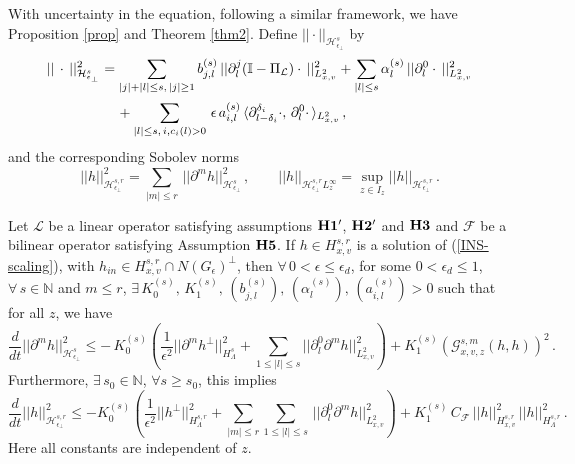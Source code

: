 \documentclass[final,onefignum,onetabnum]{siamart171218}
\begin{document}
With uncertainty in the equation, following a similar framework, we have Proposition \ref{prop} and Theorem \ref{thm2}.
Define $||\cdot||_{\mathcal H_{\epsilon_{\perp}}^s}$ by
\begin{align}
&\displaystyle ||\, \cdot\, ||_{\mathcal H_{\epsilon_{\perp}}^s}^2 = \sum_{|j|+|l|\leq s, \, |j|\geq 1}
 b_{j,l}^{(s)}\, ||\partial_l^{j} (\mathbb I -\Pi_{\mathcal L})\cdot\, ||_{L^2_{x,v}}^2 + \sum_{|l|\leq s}\alpha_l^{(s)}\, ||\partial_l^{0}\cdot\, ||_{L^2_{x,v}}^2 \notag\\[2pt]
&\displaystyle\label{norm1}\qquad\qquad\quad +\sum_{|l|\leq s, \, i, c_i(l)>0}\,  \epsilon\,  a_{i,l}^{(s)}\,\langle\partial_{l-\delta_i}^{\delta_i}\cdot, \, \partial_l^{0}\cdot\, \rangle_{L^2_{x,v}}\,,
\end{align}
and the corresponding Sobolev norms
$$ ||h||_{\mathcal H_{\epsilon_{\perp}}^{s,r}}^2 = \sum_{|m|\leq r}\, ||\partial^m h||_{\mathcal H_{\epsilon_{\perp}}^s}^2\,, \qquad
||h||_{\mathcal H_{\epsilon_{\perp}}^{s,r}L_z^{\infty}}= \sup_{z\in I_z}||h||_{\mathcal H_{\epsilon_{\perp}}^{s,r}}\,. $$
\begin{proposition}
\label{prop}
Let $\mathcal L$ be a linear operator satisfying assumptions ${\bf H1^{\prime}}$, ${\bf H2^{\prime}}$ and
${\bf H3}$ and $\mathcal F$ be a bilinear operator satisfying Assumption ${\bf H5}$.
If $h\in H_{x,v}^{s,r}$ is a solution of (\ref{INS-scaling}), with $h_{in}\in H_{x,v}^{s,r}\cap N(G_{\epsilon})^{\perp}$,
then $\forall\, 0<\epsilon\leq\epsilon_d$, for some $0<\epsilon_d\leq 1$, $\forall\, s\in \mathbb N$ and $m\leq r$,
$\exists\, K_0^{(s)}, \,K_1^{(s)}, \,(b_{j,l}^{(s)}), \,(\alpha_l^{(s)}), \,(a_{i,l}^{(s)})>0$
such that for all $z$, we have
\begin{equation}\label{pr1}\frac{d}{dt}||\partial^{m}h||_{\mathcal H_{\epsilon_{\perp}}^{s}}^2 \leq- \, K_0^{(s)}\left(\frac{1}{\epsilon^2} ||\partial^{m}h^{\perp}||_{H_{\Lambda}^{s}}^2 +
\sum_{1\leq |l|\leq s}||\partial_l^{0}\partial^{m}h||_{L^2_{x,v}}^2 \right)
 + K_1^{(s)}\left(\mathcal G_{x,v,z}^{s,m}(h,h)\right)^2\,. \end{equation}
Furthermore, $\exists\, s_0\in\mathbb N$, $\forall s\geq s_0$, this implies
\begin{equation}
\label{pr2}\frac{d}{dt}||h||_{\mathcal H_{\epsilon_{\perp}}^{s,r}}^2 \leq
- K_0^{(s)}\left(\frac{1}{\epsilon^2} ||h^{\perp}||_{H_{\Lambda}^{s,r}}^2 +
\sum_{|m|\leq r}\sum_{1\leq |l|\leq s}\, ||\partial_l^{0}\partial^m h||_{L^2_{x,v}}^2 \right)
 + K_1^{(s)}\, C_{\mathcal F}\, ||h||_{H_{x,v}^{s,r}}^2\, ||h||_{H_{\Lambda}^{s,r}}^2\,. \end{equation}
 Here all constants are independent of $z$.
 \end{proposition}
\end{document}
